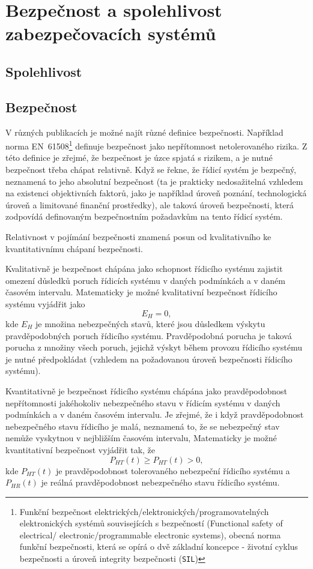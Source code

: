 \chapter{Bezpečnost a spolehlivost zabezpečovacích systémů}
 \section{Spolehlivost}
 \section{Bezpečnost}
    V různých publikacích je možné najít různé definice bezpečnosti. Například norma 
    EN~61508\footnote{Funkční bezpečnost elektrických/elektronických/programovatelných 
    elektronických systémů souvisejících s bezpečností (Functional safety of electrical/ 
    electronic/programmable electronic systems), obecná norma funkční bezpečnosti, která se opírá o 
    dvě základní koncepce - životní cyklus bezpečnosti a úroveň integrity bezpečnosti 
    (\texttt{SIL})} 
    definuje bezpečnost jako nepřítomnost netolerovaného rizika. Z této definice je zřejmé, že 
    bezpečnost je úzce spjatá s rizikem, a je nutné bezpečnost třeba chápat relativně. Když se 
    řekne, že řídicí systém je bezpečný, neznamená to jeho absolutní bezpečnost (ta je prakticky 
    nedosažitelná vzhledem na existenci objektivních faktorů, jako je například úroveň poznání, 
    technologická úroveň a limitované finanční prostředky), ale taková úroveň bezpečnosti, 
    která zodpovídá definovaným bezpečnostním požadavkům na tento řídicí systém. 

    Relativnost v pojímání bezpečnosti znamená posun od kvalitativního ke kvantitativnímu chápaní bezpečnosti.

    Kvalitativně je bezpečnost chápána jako schopnost řídicího systému zajistit omezení důsledků 
    poruch řídicích systému v daných podmínkách a v daném časovém intervalu. Matematicky je možné 
    kvalitativní bezpečnost řídicího systému vyjádřit jako 
    \begin{equation}
      E_H = 0,
    \end{equation}
    kde \(E_H\) je množina nebezpečných stavů, které jsou důsledkem výskytu pravděpodobných poruch 
    řídicího systému. Pravděpodobná porucha je taková porucha z množiny všech poruch, jejichž 
    výskyt během provozu řídicího systému je nutné předpokládat (vzhledem na požadovanou úroveň 
    bezpečnosti řídicího systému).
	
    Kvantitativně je bezpečnost řídicího systému chápána jako pravděpodobnost nepřítomnosti
    jakéhokoliv nebezpečného stavu v řídicím systému v daných podmínkách a v daném časovém
    intervalu. Je zřejmé, že i když pravděpodobnost nebezpečného stavu řídicího je malá, neznamená
    to, že se nebezpečný stav nemůže vyskytnou v nejbližším časovém intervalu, Matematicky je možné
    kvantitativní bezpečnost vyjádřit tak, že
    \begin{equation}
      P_{HT}(t)\geq P_{HT}(t)>0,
    \end{equation}
    kde \(P_{HT}(t)\) je pravděpodobnost tolerovaného nebezpeční řídicího systému a \(P_{HR}(t)\)
    je reálná pravděpodobnost nebezpeč\-ného stavu řídicího systému.
	 
